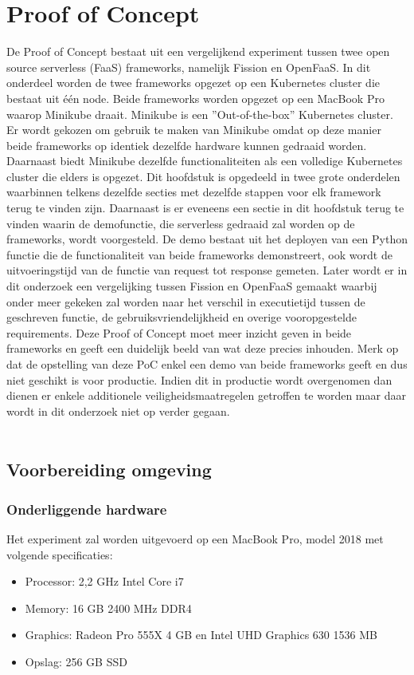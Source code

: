 \chapter{Proof of Concept}
\label{ch:proof-of-concept}
De Proof of Concept bestaat uit een vergelijkend experiment tussen twee open source serverless (FaaS) frameworks, namelijk Fission en OpenFaaS. In dit onderdeel worden de twee frameworks opgezet op een Kubernetes cluster die bestaat uit één node. Beide frameworks worden opgezet op een MacBook Pro waarop Minikube draait. Minikube is een ''Out-of-the-box'' Kubernetes cluster. Er wordt gekozen om gebruik te maken van Minikube omdat op deze manier beide frameworks op identiek dezelfde hardware kunnen gedraaid worden. Daarnaast biedt Minikube dezelfde functionaliteiten als een volledige Kubernetes cluster die elders is opgezet. Dit hoofdstuk is opgedeeld in twee grote onderdelen waarbinnen telkens dezelfde secties met dezelfde stappen voor elk framework terug te vinden zijn. Daarnaast is er eveneens een sectie in dit hoofdstuk terug te vinden waarin de demofunctie, die serverless gedraaid zal worden op de frameworks, wordt voorgesteld. De demo bestaat uit het deployen van een Python functie die de functionaliteit van beide frameworks demonstreert, ook wordt de uitvoeringstijd van de functie van request tot response gemeten. Later wordt er in dit onderzoek een vergelijking tussen Fission en OpenFaaS gemaakt waarbij onder meer gekeken zal worden naar het verschil in executietijd tussen de geschreven functie, de gebruiksvriendelijkheid en overige vooropgestelde requirements. Deze Proof of Concept moet meer inzicht geven in beide frameworks en geeft een duidelijk beeld van wat deze precies inhouden. Merk op dat de opstelling van deze PoC enkel een demo van beide frameworks geeft en dus niet geschikt is voor productie. Indien dit in productie wordt overgenomen dan dienen er enkele additionele veiligheidsmaatregelen getroffen te worden maar daar wordt in dit onderzoek niet op verder gegaan.
\\\\
\section{Voorbereiding omgeving}
\label{sec:voorbereiding-omgeving}
\subsection{Onderliggende hardware}
\label{sec:specificaties}
Het experiment zal worden uitgevoerd op een MacBook Pro, model 2018 met volgende specificaties:
\begin{itemize}
    \item Processor: 2,2 GHz Intel Core i7
    \item Memory: 16 GB 2400 MHz DDR4
    \item Graphics: Radeon Pro 555X 4 GB en Intel UHD Graphics 630 1536 MB
    \item Opslag: 256 GB SSD
\end{itemize}

